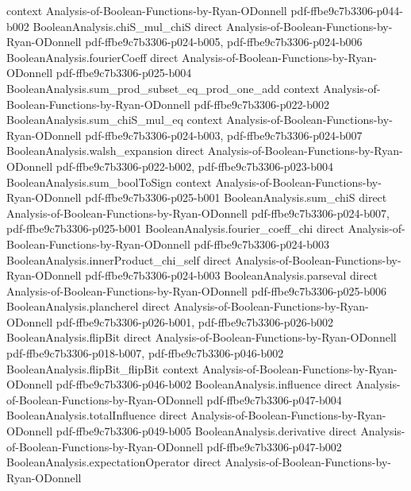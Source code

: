 \begin{theorem}
  {context}
  {Analysis-of-Boolean-Functions-by-Ryan-ODonnell}
  {pdf-ffbe9c7b3306-p044-b002}
\proofstep
  {BooleanAnalysis.chiS_mul_chiS}
  {direct}
  {Analysis-of-Boolean-Functions-by-Ryan-ODonnell}
  {pdf-ffbe9c7b3306-p024-b005,
    pdf-ffbe9c7b3306-p024-b006}
\proofstep
  {BooleanAnalysis.fourierCoeff}
  {direct}
  {Analysis-of-Boolean-Functions-by-Ryan-ODonnell}
  {pdf-ffbe9c7b3306-p025-b004}
\proofstep
  {BooleanAnalysis.sum_prod_subset_eq_prod_one_add}
  {context}
  {Analysis-of-Boolean-Functions-by-Ryan-ODonnell}
  {pdf-ffbe9c7b3306-p022-b002}
\proofstep
  {BooleanAnalysis.sum_chiS_mul_eq}
  {context}
  {Analysis-of-Boolean-Functions-by-Ryan-ODonnell}
  {pdf-ffbe9c7b3306-p024-b003,
    pdf-ffbe9c7b3306-p024-b007}
\proofstep
  {BooleanAnalysis.walsh_expansion}
  {direct}
  {Analysis-of-Boolean-Functions-by-Ryan-ODonnell}
  {pdf-ffbe9c7b3306-p022-b002,
    pdf-ffbe9c7b3306-p023-b004}
\proofstep
  {BooleanAnalysis.sum_boolToSign}
  {context}
  {Analysis-of-Boolean-Functions-by-Ryan-ODonnell}
  {pdf-ffbe9c7b3306-p025-b001}
\proofstep
  {BooleanAnalysis.sum_chiS}
  {direct}
  {Analysis-of-Boolean-Functions-by-Ryan-ODonnell}
  {pdf-ffbe9c7b3306-p024-b007,
    pdf-ffbe9c7b3306-p025-b001}
\proofstep
  {BooleanAnalysis.fourier_coeff_chi}
  {direct}
  {Analysis-of-Boolean-Functions-by-Ryan-ODonnell}
  {pdf-ffbe9c7b3306-p024-b003}
\proofstep
  {BooleanAnalysis.innerProduct_chi_self}
  {direct}
  {Analysis-of-Boolean-Functions-by-Ryan-ODonnell}
  {pdf-ffbe9c7b3306-p024-b003}
\proofstep
  {BooleanAnalysis.parseval}
  {direct}
  {Analysis-of-Boolean-Functions-by-Ryan-ODonnell}
  {pdf-ffbe9c7b3306-p025-b006}
\proofstep
  {BooleanAnalysis.plancherel}
  {direct}
  {Analysis-of-Boolean-Functions-by-Ryan-ODonnell}
  {pdf-ffbe9c7b3306-p026-b001,
    pdf-ffbe9c7b3306-p026-b002}
\proofstep
  {BooleanAnalysis.flipBit}
  {direct}
  {Analysis-of-Boolean-Functions-by-Ryan-ODonnell}
  {pdf-ffbe9c7b3306-p018-b007,
    pdf-ffbe9c7b3306-p046-b002}
\proofstep
  {BooleanAnalysis.flipBit_flipBit}
  {context}
  {Analysis-of-Boolean-Functions-by-Ryan-ODonnell}
  {pdf-ffbe9c7b3306-p046-b002}
\proofstep
  {BooleanAnalysis.influence}
  {direct}
  {Analysis-of-Boolean-Functions-by-Ryan-ODonnell}
  {pdf-ffbe9c7b3306-p047-b004}
\proofstep
  {BooleanAnalysis.totalInfluence}
  {direct}
  {Analysis-of-Boolean-Functions-by-Ryan-ODonnell}
  {pdf-ffbe9c7b3306-p049-b005}
\proofstep
  {BooleanAnalysis.derivative}
  {direct}
  {Analysis-of-Boolean-Functions-by-Ryan-ODonnell}
  {pdf-ffbe9c7b3306-p047-b002}
\proofstep
  {BooleanAnalysis.expectationOperator}
  {direct}
  {Analysis-of-Boolean-Functions-by-Ryan-ODonnell}

\end{theorem}
